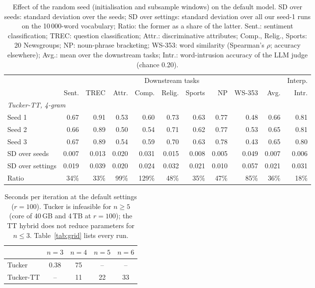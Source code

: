 \begin{table}[t]
  \centering
  \small
  \begin{tabular}{lrrrrrrrrrr}
    \toprule
     & \multicolumn{9}{c}{Downstream tasks} & \multicolumn{1}{c}{Interp.} \\
    \cmidrule(lr){2-10} \cmidrule(lr){11-11}
     & Sent. & TREC & Attr. & Comp. & Relig. & Sports & NP & WS-353 & Avg. & Intr. \\
    \midrule
    \multicolumn{11}{l}{\textit{Tucker-TT, 4-gram}} \\
    Seed 1 & 0.67 & 0.91 & 0.53 & 0.60 & 0.73 & 0.63 & 0.77 & 0.48 & 0.66 & 0.81 \\
    Seed 2 & 0.66 & 0.89 & 0.50 & 0.54 & 0.71 & 0.62 & 0.77 & 0.53 & 0.65 & 0.81 \\
    Seed 3 & 0.67 & 0.89 & 0.54 & 0.59 & 0.70 & 0.63 & 0.78 & 0.43 & 0.65 & 0.80 \\
    \midrule
    SD over seeds & 0.007 & 0.013 & 0.020 & 0.031 & 0.015 & 0.008 & 0.005 & 0.049 & 0.007 & 0.006 \\
    SD over settings & 0.019 & 0.039 & 0.020 & 0.024 & 0.032 & 0.021 & 0.010 & 0.057 & 0.021 & 0.031 \\
    Ratio & 34\% & 33\% & 99\% & 129\% & 48\% & 35\% & 47\% & 85\% & 36\% & 18\% \\
    \bottomrule
  \end{tabular}
  \caption{Effect of the random seed (initialisation and subsample windows) on the default model. SD over seeds: standard deviation over the seeds; SD over settings: standard deviation over all our seed-1 runs on the 10\,000-word vocabulary; Ratio: the former as a share of the latter. Sent.: sentiment classification; TREC: question classification; Attr.: discriminative attributes; Comp., Relig., Sports: 20 Newsgroups; NP: noun-phrase bracketing; WS-353: word similarity (Spearman's $\rho$; accuracy elsewhere); Avg.: mean over the downstream tasks; Intr.: word-intrusion accuracy of the LLM judge (chance 0.20).}
  \label{tab:seeds}
\end{table}

\begin{table}[t]
  \centering
  \small
  \begin{tabular}{lcccc}
    \toprule
     & $n=3$ & $n=4$ & $n=5$ & $n=6$ \\
    \midrule
    Tucker & 0.38 & 75 & -- & -- \\
    Tucker-TT & -- & 11 & 22 & 33 \\
    \bottomrule
  \end{tabular}
  \caption{Seconds per iteration at the default settings ($r=100$). Tucker is infeasible for $n\geq5$ (core of 40\,GB and 4\,TB at $r=100$); the TT hybrid does not reduce parameters for $n\leq3$. Table~\ref{tab:grid} lists every run.}
  \label{tab:iter-time}
\end{table}

